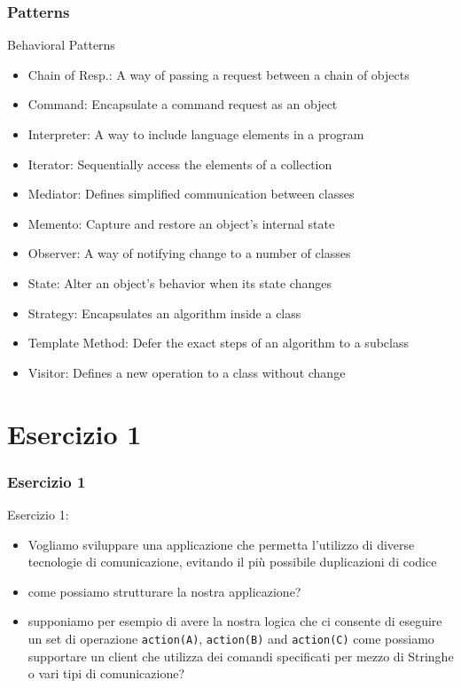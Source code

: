 \documentclass{beamer}
\begin{document}
\begin{frame}
\frametitle{Patterns}
Behavioral	Patterns\\
\begin{itemize}
\item Chain	of	Resp.:	A	way	of	passing	a	request	between	a	chain	of	objects
\item Command:	Encapsulate	a	command	request	as	an	object		
\item Interpreter:	A	way	to	include	language	elements	in	a	program	
\item Iterator:	Sequentially	access	the	elements	of	a	collection	
\item Mediator:	Defines	simplified	communication 	between	classes	
\item Memento:	Capture	and	restore	an	object's	internal	state	
\item Observer:	A	way	of	notifying	change	to	a	number	of	classes	
\item State:	Alter	an	object's	behavior	when	its	state	changes
\item Strategy:	Encapsulates	an	algorithm	inside	a	class
\item Template	Method:	Defer	the	exact	steps	of	an	algorithm	to	a	subclass	
\item Visitor:	Defines	a	new	operation	to	a	class	without	change	
\end{itemize}	
\end{frame}

\section{Esercizio 1}

\begin{frame}
\frametitle{Esercizio 1}
Esercizio 1: 
\begin{itemize}
\item Vogliamo sviluppare una applicazione che permetta l'utilizzo di diverse tecnologie di comunicazione, evitando il pi\`u possibile duplicazioni di codice
\item come possiamo strutturare la nostra applicazione?
\item supponiamo per esempio di avere la nostra logica che ci consente di eseguire un set di operazione \texttt{action(A)},  \texttt{action(B)} and  \texttt{action(C)} come possiamo supportare un client che utilizza dei comandi specificati per mezzo di Stringhe o vari tipi di comunicazione?  
\end{itemize}
\end{frame}
\end{document}
